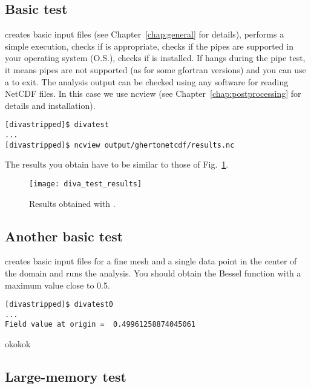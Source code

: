 \subsection{Basic test}

 creates basic input files (see Chapter~\ref{chap:general} for details), performs a simple \diva execution,
checks if  is appropriate, checks if the pipes are supported in your operating system (O.S.), checks if 
is installed.
If  hangs during the pipe test, it means pipes are not supported (as for some gfortran versions) 
and you can use a  to exit. The analysis output can be checked using any software for reading 
NetCDF files. In this case we use ncview (see Chapter~\ref{chap:postprocessing} for details and installation). 

\begin{lstlisting}[style=Bash]
[divastripped]$ divatest
...
[divastripped]$ ncview output/ghertonetcdf/results.nc
\end{lstlisting}
The results you obtain have to be similar to those of Fig.~\ref{fig:diva_test_results}.

\begin{figure}[H]
\centering 
\texttt{[image: diva\_test\_results]}
\caption{Results obtained with .\label{fig:diva_test_results}}
\end{figure}


\subsection{Another basic test}

 creates basic input files for a fine mesh and a single data point in the center of the domain and runs the analysis. You should obtain the  Bessel function with a maximum value close to 0.5.

\begin{lstlisting}[style=Bash]
[divastripped]$ divatest0
...
Field value at origin =  0.49961258874045061
\end{lstlisting}

\info okokok


\subsection{Large-memory test}

